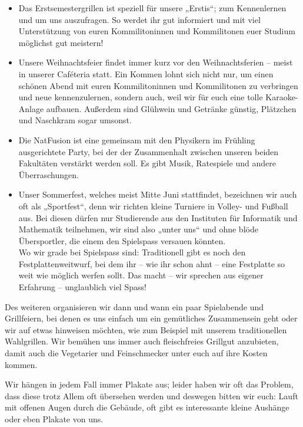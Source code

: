 \begin{itemize}
    \item Das Erstsemestergrillen ist speziell für unsere „Erstis“; zum Kennenlernen und um uns auszufragen.
          So werdet ihr gut informiert und mit viel Unterstützung von euren Kommilitoninnen und Kommilitonen euer Studium möglichst gut meistern!
    \item Unsere Weihnachtsfeier findet immer kurz vor den Weihnachtsferien -- meist in unserer Caféteria statt.
          Ein Kommen lohnt sich nicht nur, um einen schönen Abend mit euren Kommilitoninnen und Kommilitonen zu verbringen und neue kennenzulernen,
          sondern auch, weil wir für euch eine tolle Karaoke-Anlage aufbauen.
          Außerdem sind Glühwein und Getränke günstig, Plätzchen und Naschkram sogar umsonst.
    \item Die NatFusion ist eine gemeinsam mit den Physikern im Frühling ausgerichtete Party,
          bei der der Zusammenhalt zwischen unseren beiden Fakultäten verstärkt werden soll.
          Es gibt Musik, Ratespiele und andere Überraschungen.
    \item Unser Sommerfest, welches meist Mitte Juni stattfindet, bezeichnen wir auch oft als „Sportfest“,
          denn wir richten kleine Turniere in Volley- und Fußball aus.
          Bei diesen dürfen nur Studierende aus den Instituten für Informatik und Mathematik teilnehmen, wir sind also „unter uns“
          und ohne blöde Übersportler, die einem den Spielspass versauen könnten.\\
          Wo wir grade bei Spielspass sind: Traditionell gibt es noch den Festplattenweitwurf,
          bei dem ihr -- wie ihr schon ahnt -- eine Festplatte so weit wie möglich werfen sollt.
          Das macht -- wir sprechen aus eigener Erfahrung -- unglaublich viel Spass!
\end{itemize}

Des weiteren organisieren wir dann und wann ein paar Spielabende und Grillfeiern, bei denen es uns einfach um ein gemütliches Zusammensein geht oder wir auf etwas hinweisen möchten, wie zum Beispiel mit unserem traditionellen Wahlgrillen.
Wir bemühen uns immer auch fleischfreies Grillgut anzubieten, damit auch die Vegetarier und Feinschmecker unter euch auf ihre Kosten kommen.

Wir hängen in jedem Fall immer Plakate aus; leider haben wir oft das Problem, dass diese trotz Allem oft übersehen werden und deswegen bitten wir euch:
Lauft mit offenen Augen durch die Gebäude, oft gibt es interessante kleine Aushänge oder eben Plakate von uns.

